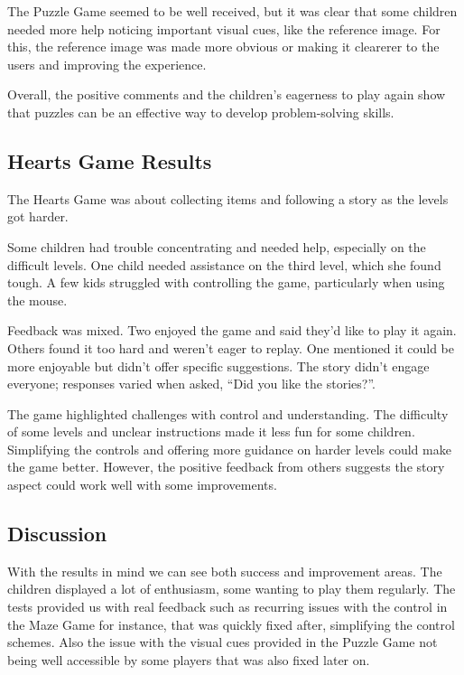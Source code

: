 The Puzzle Game seemed to be well received, but it was clear that some children needed more help noticing important visual cues, like the reference image. For this, the reference image was made more obvious or making it clearerer to the users and improving the experience.

Overall, the positive comments and the children’s eagerness to play again show that puzzles can be an effective way to develop problem-solving skills.

\subsection{Hearts Game Results}

The Hearts Game was about collecting items and following a story as the levels got harder.

Some children had trouble concentrating and needed help, especially on the difficult levels. One child needed assistance on the third level, which she found tough. A few kids struggled with controlling the game, particularly when using the mouse.

Feedback was mixed. Two enjoyed the game and said they’d like to play it again. Others found it too hard and weren’t eager to replay. One mentioned it could be more enjoyable but didn’t offer specific suggestions. The story didn’t engage everyone; responses varied when asked, “Did you like the stories?”.

The game highlighted challenges with control and understanding. The difficulty of some levels and unclear instructions made it less fun for some children. Simplifying the controls and offering more guidance on harder levels could make the game better. However, the positive feedback from others suggests the story aspect could work well with some improvements.

\newpage
\subsection{Discussion}

With the results in mind we can see both success and improvement areas. The children displayed a lot of enthusiasm, some wanting to play them regularly. The tests provided us with real feedback such as recurring issues with the control in the Maze Game for instance, that was quickly fixed after, simplifying the control schemes. Also the issue with the visual cues provided in the Puzzle Game not being well accessible by some players that was also fixed later on.



